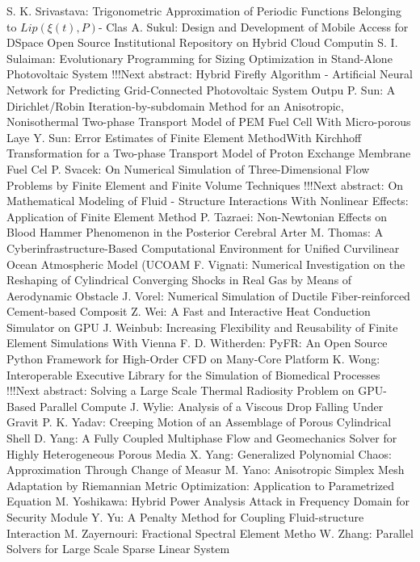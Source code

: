 \documentclass[10pt, A4]{article}%
\begin{document}
{S. K. Srivastava}: {Trigonometric Approximation of Periodic Functions Belonging to $Lip(\xi(t), P)$- Clas}
{A. Sukul}: {Design and Development of Mobile Access for DSpace Open Source Institutional Repository on Hybrid Cloud Computin}
{S. I. Sulaiman}: {Evolutionary Programming for Sizing Optimization in Stand-Alone Photovoltaic System      !!!Next abstract: Hybrid Firefly Algorithm - Artificial Neural Network for Predicting Grid-Connected Photovoltaic System Outpu}
{P. Sun}: {A Dirichlet/Robin Iteration-by-subdomain Method for an Anisotropic, Nonisothermal Two-phase Transport Model of PEM Fuel Cell With Micro-porous Laye}
{Y. Sun}: {Error Estimates of Finite Element MethodWith Kirchhoff Transformation for a Two-phase Transport Model of Proton Exchange Membrane Fuel Cel}
{P. Svacek}: {On Numerical Simulation of Three-Dimensional Flow Problems by Finite Element and Finite Volume Techniques      !!!Next abstract: On Mathematical Modeling of Fluid - Structure Interactions With Nonlinear Effects: Application of Finite Element Method}
{P. Tazraei}: {Non-Newtonian Effects on Blood Hammer Phenomenon in the Posterior Cerebral Arter}
{M. Thomas}: {A Cyberinfrastructure-Based Computational Environment for Unified Curvilinear Ocean Atmospheric Model  (UCOAM}
{F. Vignati}: {Numerical Investigation on the Reshaping of Cylindrical Converging Shocks in Real Gas by Means of Aerodynamic Obstacle}
{J. Vorel}: {Numerical Simulation of Ductile Fiber-reinforced Cement-based Composit}
{Z. Wei}: {A Fast and Interactive Heat Conduction Simulator on GPU}
{J. Weinbub}: {Increasing Flexibility and Reusability of Finite Element Simulations With Vienna}
{F. D. Witherden}: {PyFR: An Open Source Python Framework for High-Order CFD on Many-Core Platform}
{K. Wong}: {Interoperable Executive Library for the Simulation of Biomedical Processes      !!!Next abstract: Solving a Large Scale Thermal Radiosity Problem on GPU-Based Parallel Compute}
{J. Wylie}: {Analysis of a Viscous Drop Falling Under Gravit}
{P. K. Yadav}: {Creeping Motion of an Assemblage of Porous Cylindrical Shell}
{D. Yang}: {A Fully Coupled Multiphase Flow and Geomechanics Solver for Highly Heterogeneous Porous Media}
{X. Yang}: {Generalized Polynomial Chaos: Approximation Through Change of Measur}
{M. Yano}: {Anisotropic Simplex Mesh Adaptation by Riemannian Metric Optimization: Application to Parametrized Equation}
{M. Yoshikawa}: {Hybrid Power Analysis Attack in Frequency Domain for Security Module}
{Y. Yu}: {A Penalty Method for Coupling Fluid-structure Interaction}
{M. Zayernouri}: {Fractional Spectral Element Metho}
{W. Zhang}: {Parallel Solvers for Large Scale Sparse Linear System}
\end{document}
